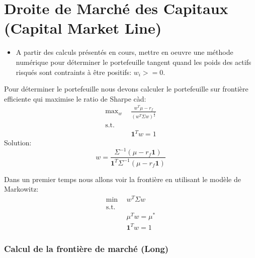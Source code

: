 \documentclass[
]{article}
\providecommand{\tightlist}{%
  \setlength{\itemsep}{0pt}\setlength{\parskip}{0pt}}
\begin{document}
\hypertarget{droite-de-marchuxe9-des-capitaux-capital-market-line}{%
\section{Droite de Marché des Capitaux (Capital Market
Line)}\label{droite-de-marchuxe9-des-capitaux-capital-market-line}}

\begin{itemize}
\tightlist
\item
  A partir des calculs présentés en cours, mettre en oeuvre une méthode
  numérique pour déterminer le portefeuille tangent quand les poids des
  actifs risqués sont contraints à être positifs: \(w_i >= 0\).
\end{itemize}

Pour déterminer le portefeuille nous devons calculer le portefeuille sur
frontière efficiente qui maximise le ratio de Sharpe càd: \[
\begin{aligned}
    \mbox{max}_w \ \  &  \frac{w^T \mu - r_f}{(w^T \Sigma w)^{\frac{1}{2}}} \\
    \mbox{s.t.} & \\
    & \mathbf{1}^T w  = 1
\end{aligned}
\] Solution: \[
w = \frac{\Sigma^{-1}(\mu - r_f  \mathbf{1})}{\mathbf{1}^T\Sigma^{-1}(\mu - r_f \mathbf{1})}
\]

Dans un premier temps nous allons voir la frontière en utilisant le
modèle de Markowitz: \[
\begin{aligned}
    \mbox{min}\ \  &  w^T \Sigma w \\
    \mbox{s.t.} & \\
    & \mu^T w = \mu^* \\
    & \mathbf{1}^T w  = 1
\end{aligned}
\]

\hypertarget{calcul-de-la-frontiuxe8re-de-marchuxe9-long}{%
\subsubsection{Calcul de la frontière de marché
(Long)}\label{calcul-de-la-frontiuxe8re-de-marchuxe9-long}}
\end{document}

